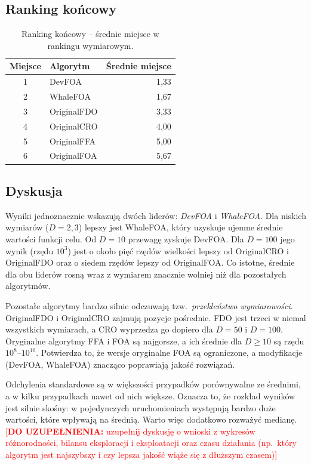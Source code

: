 \documentclass[12pt,a4paper]{article}
\newcommand{\todo}[1]{\textcolor{red}{[\textbf{DO UZUPEŁNIENIA:} #1]}}
\begin{document}
\subsection{Ranking końcowy}

\begin{table}[H]
\centering
\caption{Ranking końcowy -- średnie miejsce w rankingu wymiarowym.}
\label{tab:final}
\begin{tabular}{clr}
\toprule
Miejsce & Algorytm & Średnie miejsce \\
\midrule
1 & DevFOA      & 1{,}33 \\
2 & WhaleFOA    & 1{,}67 \\
3 & OriginalFDO & 3{,}33 \\
4 & OriginalCRO & 4{,}00 \\
5 & OriginalFFA & 5{,}00 \\
6 & OriginalFOA & 5{,}67 \\
\bottomrule
\end{tabular}
\end{table}

\subsection{Dyskusja}

Wyniki jednoznacznie wskazują dwóch liderów: \textit{DevFOA} i \textit{WhaleFOA}.
Dla niskich wymiarów ($D=2,3$) lepszy jest WhaleFOA, który uzyskuje ujemne
średnie wartości funkcji celu. Od $D=10$ przewagę zyskuje DevFOA. Dla $D=100$
jego wynik (rzędu $10^{3}$) jest o około pięć rzędów wielkości lepszy
od OriginalCRO i OriginalFDO oraz o siedem rzędów lepszy od OriginalFOA.
Co istotne, średnie dla obu liderów rosną wraz z wymiarem znacznie wolniej niż
dla pozostałych algorytmów.

Pozostałe algorytmy bardzo silnie odczuwają tzw.\ \textit{przekleństwo wymiarowości}.
OriginalFDO i OriginalCRO zajmują pozycje pośrednie. FDO jest trzeci w niemal
wszystkich wymiarach, a CRO wyprzedza go dopiero dla $D=50$ i $D=100$.
Oryginalne algorytmy FFA i FOA są najgorsze, a ich średnie dla $D\geq 10$ są rzędu $10^{8}$--$10^{10}$.
Potwierdza to, że wersje oryginalne FOA są ograniczone, a modyfikacje (DevFOA, WhaleFOA)
znacząco poprawiają jakość rozwiązań.

Odchylenia standardowe są w większości przypadków porównywalne ze średnimi, a w kilku
przypadkach nawet od nich większe. Oznacza to, że rozkład wyników jest silnie
skośny: w pojedynczych uruchomieniach występują bardzo duże wartości, które wpływają
na średnią. Warto więc dodatkowo rozważyć medianę.
\todo{uzupełnij dyskusję o wnioski z wykresów różnorodności, bilansu eksploracji
i eksploatacji oraz czasu działania (np.\ który algorytm jest najszybszy i czy
lepsza jakość wiąże się z dłuższym czasem)}
\end{document}
